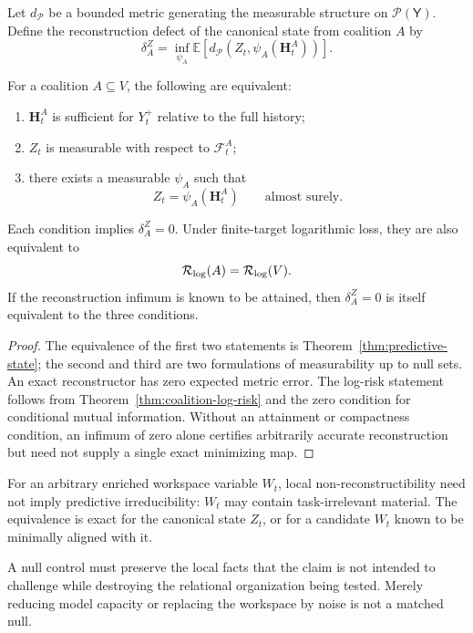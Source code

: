 
Let \(d_{\mathcal P}\) be a bounded metric generating the measurable structure
on \(\mathcal P(\mathsf Y)\). Define the reconstruction defect of the canonical
state from coalition \(A\) by
\[
\delta_A^Z
=
\inf_{\psi_A}
\mathbb E\!\left[
 d_{\mathcal P}\!\left(
 Z_t,\psi_A(\mathbf H_t^A)
 \right)
\right].
\]

\begin{proposition}
\label{prop:sufficiency-reconstruction}
For a coalition \(A\subseteq V\), the following are equivalent:
\begin{enumerate}
\item \(\mathbf H_t^A\) is sufficient for \(Y_t^+\) relative to the full
 history;
\item \(Z_t\) is measurable with respect to \(\mathcal F_t^A\);
\item there exists a measurable \(\psi_A\) such that
\[
Z_t=\psi_A(\mathbf H_t^A)
\qquad\text{almost surely}.
\]
\end{enumerate}
Each condition implies \(\delta_A^Z=0\). Under finite-target logarithmic loss,
they are also equivalent to
\[
\mathcal R_{\log}(A)=\mathcal R_{\log}(V).
\]
If the reconstruction infimum is known to be attained, then
\(\delta_A^Z=0\) is itself equivalent to the three conditions.
\end{proposition}

\begin{proof}
The equivalence of the first two statements is
Theorem~\ref{thm:predictive-state}; the second and third are two formulations
of measurability up to null sets. An exact reconstructor has zero expected
metric error. The log-risk statement follows from
Theorem~\ref{thm:coalition-log-risk} and the zero condition for conditional
mutual information. Without an attainment or compactness condition, an
infimum of zero alone certifies arbitrarily accurate reconstruction but need
not supply a single exact minimizing map.
\end{proof}

For an arbitrary enriched workspace variable \(W_t\), local
non-reconstructibility need not imply predictive irreducibility: \(W_t\) may
contain task-irrelevant material. The equivalence is exact for the canonical
state \(Z_t\), or for a candidate \(W_t\) known to be minimally aligned with
it.


A null control must preserve the local facts that the claim is not intended to
challenge while destroying the relational organization being tested. Merely
reducing model capacity or replacing the workspace by noise is not a matched
null.

